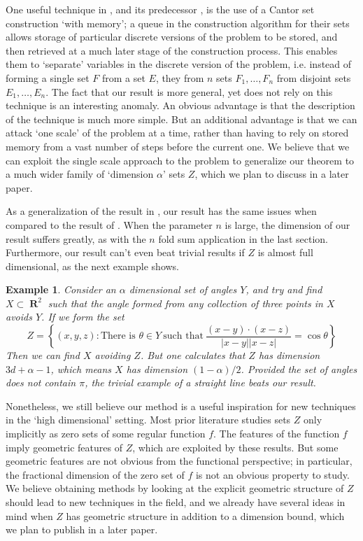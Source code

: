 \documentclass[dvipsnames,letterpaper,12pt]{article}
\numberwithin{equation}{section}
\theoremstyle{plain}
\newtheorem*{example}{Example}
\DeclareMathOperator{\RR}{\mathbf{R}}
\begin{document}
One useful technique in \cite{MalabikaRob}, and its predecessor \cite{KeletiDimOneSet}, is the use of a Cantor set construction `with memory'; a queue in the construction algorithm for their sets allows storage of particular discrete versions of the problem to be stored, and then retrieved at a much later stage of the construction process. This enables them to `separate' variables in the discrete version of the problem, i.e. instead of forming a single set $F$ from a set $E$, they from $n$ sets $F_1, \dots, F_n$ from disjoint sets $E_1, \dots, E_n$. The fact that our result is more general, yet does not rely on this technique is an interesting anomaly. An obvious advantage is that the description of the technique is much more simple. But an additional advantage is that we can attack `one scale' of the problem at a time, rather than having to rely on stored memory from a vast number of steps before the current one. We believe that we can exploit the single scale approach to the problem to generalize our theorem to a much wider family of `dimension $\alpha$' sets $Z$, which we plan to discuss in a later paper.

As a generalization of the result in \cite{MalabikaRob}, our result has the same issues when compared to the result of \cite{Mathe}. When the parameter $n$ is large, the dimension of our result suffers greatly, as with the $n$ fold sum application in the last section. Furthermore, our result can't even beat trivial results if $Z$ is almost full dimensional, as the next example shows.

\begin{example}
	Consider an $\alpha$ dimensional set of angles $Y$, and try and find $X \subset \RR^2$ such that the angle formed from any collection of three points in $X$ avoids $Y$. If we form the set
	\[ Z = \left\{ (x,y,z): \text{There is $\theta \in Y$}\ \text{such that}\ \frac{(x - y) \cdot (x - z)}{|x - y||x - z|} = \cos \theta \right\} \]
	Then we can find $X$ avoiding $Z$. But one calculates that $Z$ has dimension $3d + \alpha - 1$, which means $X$ has dimension $(1 - \alpha) / 2$. Provided the set of angles does not contain $\pi$, the trivial example of a straight line beats our result.
\end{example}

Nonetheless, we still believe our method is a useful inspiration for new techniques in the `high dimensional' setting. Most prior literature studies sets $Z$ only implicitly as zero sets of some regular function $f$. The features of the function $f$ imply geometric features of $Z$, which are exploited by these results. But some geometric features are not obvious from the functional perspective; in particular, the fractional dimension of the zero set of $f$ is not an obvious property to study. We believe obtaining methods by looking at the explicit geometric structure of $Z$ should lead to new techniques in the field, and we already have several ideas in mind when $Z$ has geometric structure in addition to a dimension bound, which we plan to publish in a later paper.
\end{document}
